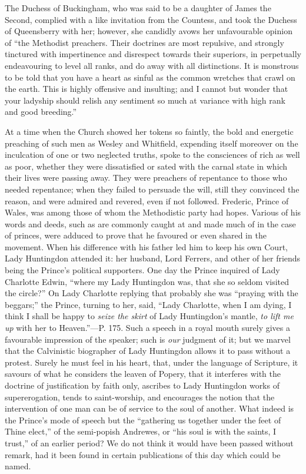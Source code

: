 The Duchess of Buckingham, who was said to be a
daughter of James the Second, complied with a like invitation from the
Countess, and took the Duchess of Queensberry with her; however, she
candidly avows her unfavourable opinion of ``the Methodist preachers.
Their doctrines are most repulsive, and strongly tinctured with
impertinence and disrespect towards their superiors, in perpetually
endeavouring to level all ranks, and do away with all
distinctions. It is monstrous to be told that you have a heart as
sinful as the common wretches that crawl on the earth. This is highly
offensive and insulting; and I cannot but wonder that your ladyship
should relish any sentiment so much at variance with high rank and
good breeding.''

At a time when the Church showed her tokens so
faintly, the bold and energetic preaching of such men as Wesley and
Whitfield, expending itself moreover on the inculcation of one or two
neglected truths, spoke to the consciences of rich as well as poor,
whether they were dissatisfied or sated with the carnal state in which
their lives were passing away. They were preachers of repentance to
those who needed repentance; when they failed to persuade the will,
still they convinced the reason, and were admired and revered, even if
not followed. Frederic, Prince of Wales, was among those of whom the
Methodistic party had hopes. Various of his words and deeds, such as
are commonly caught at and made much of in the case of princes, were
adduced to prove that he favoured or even shared in the movement. When
his difference with his father led him to keep his own Court, Lady
Huntingdon attended it: her husband, Lord Ferrers, and other of her
friends being the Prince's political supporters. One day the Prince
inquired of Lady Charlotte Edwin, ``where my Lady Huntingdon was, that
she so seldom visited the circle?'' On Lady Charlotte replying that
probably she was ``praying with the beggars;'' the Prince, turning to
her, said, ``Lady Charlotte, when I am dying, I think I shall be happy
to \emph{seize the skirt} of Lady Huntingdon's mantle, \emph{to lift me
up} with her to Heaven.''—P. 175. Such a speech in a royal mouth
surely gives a favourable impression of the speaker; such is \emph{our}
judgment of it; but we marvel that the Calvinistic biographer of
Lady Huntingdon allows it to pass without a protest. Surely he must
feel in his heart, that, under the language of Scripture, it savours
of what he considers the leaven of Popery, that it interferes with the
doctrine of justification by faith only, ascribes to Lady Huntingdon
works of supererogation, tends to saint-worship, and encourages the
notion that the intervention of one man can be of service to the soul
of another. What indeed is the Prince's mode of speech but the ``gathering
us together under the feet of Thine elect,'' of the semi-popish
Andrewes, or ``his soul is with the saints, I trust,'' of an earlier
period? We do not think it would have been passed without remark, had
it been found in certain publications of this day which could be
named.


